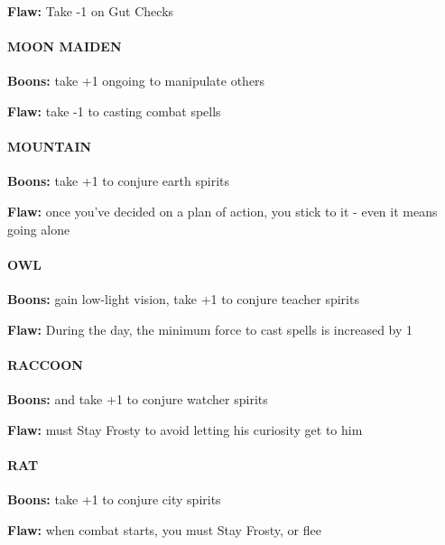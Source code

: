 \documentclass[oneside,10pt]{article}
\begin{document}
\begin{multicols}{2}
\begin{adjustwidth*}{.5cm}{.5cm}
\textbf{Flaw:} Take -1 on Gut Checks
\end{adjustwidth*}

\paragraph{MOON MAIDEN}
\begin{adjustwidth*}{.5cm}{.5cm}
\textbf{Boons:} take +1 ongoing to manipulate others

\textbf{Flaw:} take -1 to casting combat spells
\end{adjustwidth*}

\paragraph{MOUNTAIN}
\begin{adjustwidth*}{.5cm}{.5cm}
\textbf{Boons:} take +1 to conjure earth spirits

\textbf{Flaw:} once you've decided on a plan of action, you stick to it - even it means going alone
\end{adjustwidth*}


\paragraph{OWL}
\begin{adjustwidth*}{.5cm}{.5cm}
\textbf{Boons:} gain low-light vision, take +1 to conjure teacher
spirits

\textbf{Flaw:} During the day, the minimum force to cast spells is increased by 1
\end{adjustwidth*}


\paragraph{RACCOON}
\begin{adjustwidth*}{.5cm}{.5cm}
\textbf{Boons:} and take +1 to conjure watcher spirits

\textbf{Flaw:} must Stay Frosty to avoid letting his curiosity get to
him
\end{adjustwidth*}


\paragraph{RAT}
\begin{adjustwidth*}{.5cm}{.5cm}
\textbf{Boons:} take +1 to conjure city spirits

\textbf{Flaw:} when combat starts, you must Stay Frosty, or flee
\end{adjustwidth*}



\end{multicols}
\end{document}
